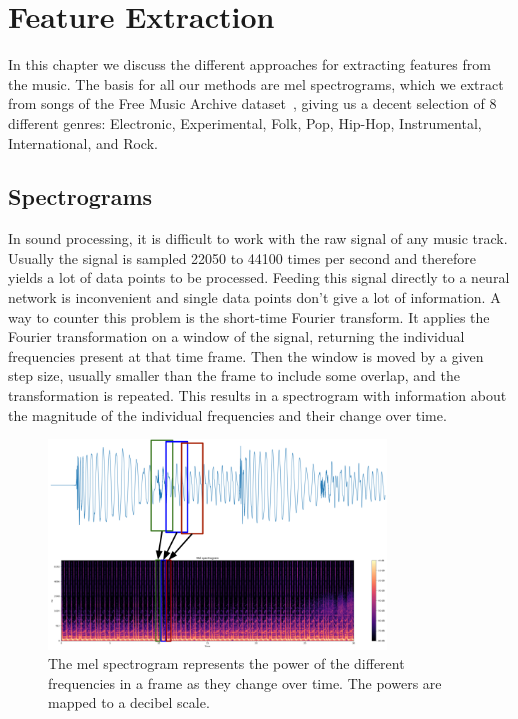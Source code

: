 \chapter{Feature Extraction}\label{ch:extraction}
    In this chapter we discuss the different approaches for extracting features from the music. 
    The basis for all our methods are mel spectrograms, which we extract from songs of the Free Music Archive dataset~\cite{FMA}, giving us a decent selection of 8 different genres: Electronic, Experimental, Folk, Pop, Hip-Hop, Instrumental, International, and Rock.

\section{Spectrograms}
    In sound processing, it is difficult to work with the raw signal of any music track.
    Usually the signal is sampled 22050 to 44100 times per second and therefore yields a lot of data points to be processed. 
    Feeding this signal directly to a neural network is inconvenient and single data points don't give a lot of information.
    A way to counter this problem is the short-time Fourier transform. 
    It applies the Fourier transformation on a window of the signal, returning the individual frequencies present at that time frame. 
    Then the window is moved by a given step size, usually smaller than the frame to include some overlap, and the transformation is repeated.
    This results in a spectrogram with information about the magnitude of the individual frequencies and their change over time.\\
    \begin{figure}[!b]
        \centering
        \includegraphics[width=0.8\textwidth]{images/sigToMels.png}
        \caption{The mel spectrogram represents the power of the different frequencies in a frame as they change over time. The powers are mapped to a decibel scale.}
        \label{mel}
    \end{figure}
